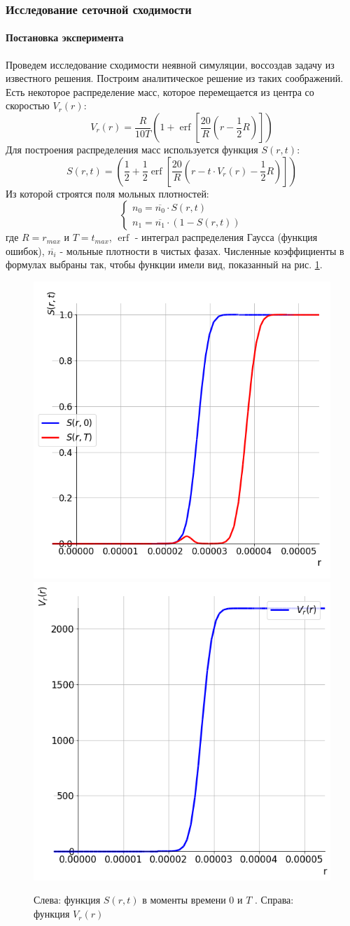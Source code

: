 \subsubsection{Исследование сеточной сходимости \label{dhd:convergence}}
\paragraph{Постановка эксперимента}
Проведем исследование сходимости неявной симуляции, воссоздав задачу из известного решения. Построим аналитическое решение из таких соображений. Есть некоторое распределение масс, которое перемещается из центра со скоростью $V_r(r)$:
\begin{equation}
V_r(r) = \frac{R} {10 T}  \left(1 + \operatorname{erf} \left[\frac{20} {R} \left( r - \frac{1}{2} R \right)  \right] \right)
\end{equation}
Для построения распределения масс используется функция $S(r, t)$:
\begin{equation}
S(r, t) = \left(\frac{1}{2} + \frac{1}{2} \operatorname{erf} \left[ \frac{20}{R} \left( r - t \cdot V_r(r) - {\frac{1}{2}R} \right) \right] \right)
\end{equation}
Из которой строятся поля мольных плотностей:
\begin{equation}
\begin{cases}
n_0 = \overline{n_0} \cdot S(r, t) 
\\
n_1 = \overline{n_1} \cdot (1 - S(r, t))
\end{cases}
\end{equation}
где $R = r_{max}$ и $T = t_{max}$, $\operatorname{erf}$ - интеграл распределения Гаусса (функция ошибок), $\overline{n_i}$ - мольные плотности в чистых фазах. Численные коэффициенты в формулах выбраны так, чтобы функции имели вид, показанный на рис. \ref{fig:dhd_convergence_analytic}. 
\begin{figure}[H]
\centering
\includegraphics[width=.4\textwidth]{dhd_convergence/analytic_n.png}
\includegraphics[width=.4\textwidth]{dhd_convergence/analytic_V.png}
\caption{Слева: функция $S(r, t)$ в моменты времени $0$  и $T$ . Справа: функция $V_r(r)$}
\label{fig:dhd_convergence_analytic}
\end{figure}
